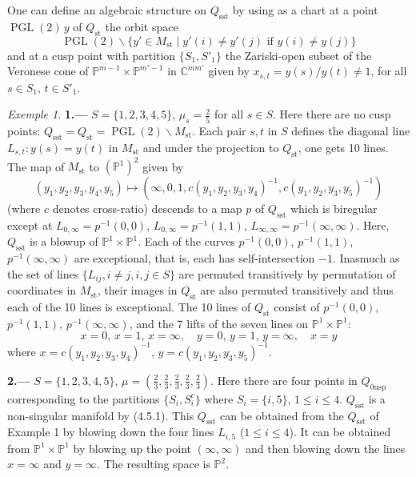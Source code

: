 \documentclass[12pt,a4paper]{article}
\theoremstyle{plain}
\theoremstyle{definition}
\theoremstyle{remark}
\newtheorem{example}[theorem]{Exemple}
\DeclareMathOperator{\PGL}{PGL}
\newcommand{\CC}{\mathbb{C}}
\newcommand{\PP}{\mathbb{P}}
\numberwithin{equation}{section}
\providecommand{\CC}{\mathbb{C}}
\providecommand{\PP}{\mathbb{P}}
\providecommand{\PGL}{\operatorname{PGL}}
\begin{document}
One can define an algebraic structure on $Q_{\mathrm{sst}}$ by using as a chart at a point $\PGL(2) \, y$ of $Q_{\mathrm{st}}$ the orbit space
\[
\PGL(2) \backslash \{y' \in M_{\mathrm{st}} \mid y'(i) \neq y'(j) \text{ if } y(i) \neq y(j)\}
\]
and at a cusp point with partition $\{S_1, S'_1\}$ the Zariski-open subset of the Veronese cone of $\PP^{m-1} \times \PP^{m'-1}$ in $\CC^{mm'}$ given by $x_{s,t} = y(s)/y(t) \neq 1$, for all $s \in S_1$, $t \in S'_1$.

\begin{example}
\textbf{1.---} $S = \{1, 2, 3, 4, 5\}$, $\mu_s = \frac{2}{5}$ for all $s \in S$. Here there are no cusp points: $Q_{\mathrm{sst}} = Q_{\mathrm{st}} = \PGL(2) \backslash M_{\mathrm{st}}$. Each pair $s, t$ in $S$ defines the diagonal line $L_{s,t}: y(s) = y(t)$ in $M_{\mathrm{st}}$ and under the projection to $Q_{\mathrm{st}}$, one gets 10 lines. The map of $M_{\mathrm{st}}$ to $(\PP^1)^2$ given by
\[
(y_1, y_2, y_3, y_4, y_5) \mapsto (\infty, 0, 1, c(y_1, y_2, y_3, y_4)^{-1}, c(y_1, y_2, y_3, y_5)^{-1})
\]
(where $c$ denotes cross-ratio) descends to a map $p$ of $Q_{\mathrm{sst}}$ which is biregular except at $L_{0,\infty} = p^{-1}(0,0)$, $L_{0,\infty} = p^{-1}(1,1)$, $L_{\infty,\infty} = p^{-1}(\infty, \infty)$. Here, $Q_{\mathrm{sst}}$ is a blowup of $\PP^1 \times \PP^1$. Each of the curves $p^{-1}(0,0)$, $p^{-1}(1,1)$, $p^{-1}(\infty, \infty)$ are exceptional, that is, each has self-intersection $-1$. Inasmuch as the set of lines $\{L_{ij}, i \neq j, i, j \in S\}$ are permuted transitively by permutation of coordinates in $M_{\mathrm{st}}$, their images in $Q_{\mathrm{st}}$ are also permuted transitively and thus each of the 10 lines is exceptional. The 10 lines of $Q_{\mathrm{st}}$ consist of $p^{-1}(0,0)$, $p^{-1}(1,1)$, $p^{-1}(\infty, \infty)$, and the 7 lifts of the seven lines on $\PP^1 \times \PP^1$:
\[
x = 0, \, x = 1, \, x = \infty, \quad y = 0, \, y = 1, \, y = \infty, \quad x = y
\]
where $x = c(y_1, y_2, y_3, y_4)^{-1}$, $y = c(y_1, y_2, y_3, y_5)^{-1}$.

\textbf{2.---} $S = \{1, 2, 3, 4, 5\}$, $\mu = (\frac{2}{3}, \frac{2}{3}, \frac{2}{3}, \frac{2}{3}, \frac{2}{3})$. Here there are four points in $Q_{0\mathrm{usp}}$ corresponding to the partitions $\{S_i, S^c_i\}$ where $S_i = \{i, 5\}$, $1 \leq i \leq 4$. $Q_{\mathrm{sst}}$ is a non-singular manifold by (4.5.1). This $Q_{\mathrm{sst}}$ can be obtained from the $Q_{\mathrm{sst}}$ of Example 1 by blowing down the four lines $L_{i,5}$ ($1 \leq i \leq 4$). It can be obtained from $\PP^1 \times \PP^1$ by blowing up the point $(\infty, \infty)$ and then blowing down the lines $x = \infty$ and $y = \infty$. The resulting space is $\PP^2$.
\end{example}
\end{document}
